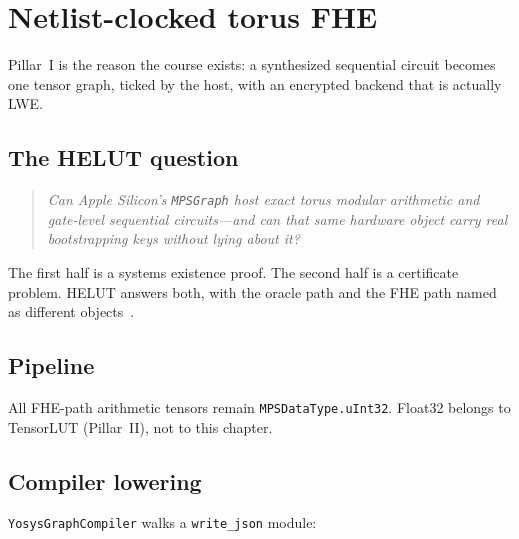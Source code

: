 \chapter{Netlist-clocked torus FHE}
\label{ch:pillari}

Pillar~I is the reason the course exists: a synthesized sequential circuit
becomes one tensor graph, ticked by the host, with an encrypted backend that
is actually LWE.

\section{The HELUT question}

\begin{quote}
\emph{Can Apple Silicon's \texttt{MPSGraph} host exact torus modular arithmetic
and gate-level sequential circuits---and can that same hardware object carry
real bootstrapping keys without lying about it?}
\end{quote}

The first half is a systems existence proof.
The second half is a certificate problem.
HELUT answers both, with the oracle path and the FHE path named as different
objects~\cite{helut-paper,helut-release}.

\section{Pipeline}

\begin{center}
\end{center}

All FHE-path arithmetic tensors remain \texttt{MPSDataType.uInt32}.
Float32 belongs to TensorLUT (Pillar~II), not to this chapter.

\section{Compiler lowering}

\texttt{YosysGraphCompiler} walks a \texttt{write\_json} module:

